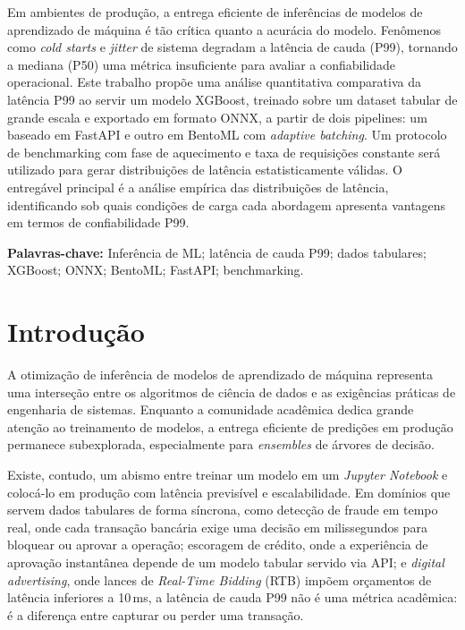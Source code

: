 \documentclass[12pt,a4paper]{article}
\renewcommand{\cite}{\supercite}
\begin{document}
Em ambientes de produção, a entrega eficiente de inferências de modelos de aprendizado de máquina é tão crítica quanto a acurácia do modelo. Fenômenos como \textit{cold starts} e \textit{jitter} de sistema degradam a latência de cauda (P99), tornando a mediana (P50) uma métrica insuficiente para avaliar a confiabilidade operacional. Este trabalho propõe uma análise quantitativa comparativa da latência P99 ao servir um modelo XGBoost, treinado sobre um dataset tabular de grande escala e exportado em formato ONNX, a partir de dois pipelines: um baseado em FastAPI e outro em BentoML com \textit{adaptive batching}. Um protocolo de benchmarking com fase de aquecimento e taxa de requisições constante será utilizado para gerar distribuições de latência estatisticamente válidas. O entregável principal é a análise empírica das distribuições de latência, identificando sob quais condições de carga cada abordagem apresenta vantagens em termos de confiabilidade P99.

\textbf{Palavras-chave:} Inferência de ML; latência de cauda P99; dados tabulares; XGBoost; ONNX; BentoML; FastAPI; benchmarking.

\newpage
\section{Introdução}

A otimização de inferência de modelos de aprendizado de máquina representa uma interseção entre os algoritmos de ciência de dados e as exigências práticas de engenharia de sistemas.\cite{nakandala2020} Enquanto a comunidade acadêmica dedica grande atenção ao treinamento de modelos, a entrega eficiente de predições em produção permanece subexplorada, especialmente para \textit{ensembles} de árvores de decisão.\cite{asadi2024}

Existe, contudo, um abismo entre treinar um modelo em um \textit{Jupyter Notebook} e colocá-lo em produção com latência previsível e escalabilidade. Em domínios que servem dados tabulares de forma síncrona, como detecção de fraude em tempo real, onde cada transação bancária exige uma decisão em milissegundos para bloquear ou aprovar a operação; escoragem de crédito, onde a experiência de aprovação instantânea depende de um modelo tabular servido via API; e \textit{digital advertising}, onde lances de \textit{Real-Time Bidding} (RTB) impõem orçamentos de latência inferiores a 10\,ms, a latência de cauda P99 não é uma métrica acadêmica: é a diferença entre capturar ou perder uma transação.
\end{document}

